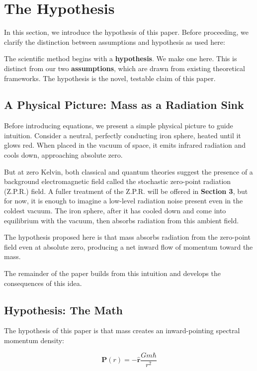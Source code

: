 \documentclass {article}
\renewcommand\vec{\mathbf}
\let\OldHat\hat
\renewcommand{\hat}[1]{\OldHat{\mathbf{#1}}}
\begin{document}
\section{The Hypothesis}

In this section, we introduce the hypothesis of this paper. Before proceeding, we clarify the distinction between assumptions and hypothesis as used here:

The scientific method begins with a \textbf{hypothesis}. We make one here. This is distinct from our two \textbf{assumptions}, which are drawn from existing theoretical frameworks. The hypothesis is the novel, testable claim of this paper.


\subsection{A Physical Picture: Mass as a Radiation Sink }
\label{subsec:intuition}

Before introducing equations, we present a simple physical picture to guide intuition. Consider a neutral, perfectly conducting iron sphere, heated until it glows red. When placed in the vacuum of space, it emits infrared radiation and cools down, approaching absolute zero.

But at zero Kelvin, both classical and quantum theories suggest the presence of a background electromagnetic field called the stochastic zero-point radiation (Z.P.R.) field. A fuller treatment of the Z.P.R. will be offered in \textbf{Section 3}, but for now, it is enough to imagine a low-level radiation noise present even in the coldest vacuum. The iron sphere, after it has cooled down and come into equilibrium with the vacuum, then absorbs radiation from this ambient field.

The hypothesis proposed here is that mass absorbs radiation from the zero-point field even at absolute zero, producing a net inward flow of momentum toward the mass.

The remainder of the paper builds from this intuition and develops the consequences of this idea.



\subsection{Hypothesis: The Math}

The hypothesis of this paper is that mass creates an inward-pointing spectral momentum density:

\begin{equation}
\boxed{\vec{P}(r) = -\hat{r} \frac{G m \hbar}{r^2}}
\label{eq:hypothesis}
\end{equation}
\end{document}
